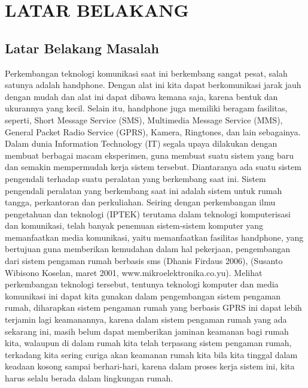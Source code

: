 \documentclass{jtetiproposalskripsi}
\begin{document}
\tableofcontents
{}
\clearpage{}\setcounter{page}{1}

\chapter{LATAR BELAKANG}

\section{Latar Belakang Masalah}
Perkembangan teknologi komunikasi saat ini berkembang sangat pesat, salah satunya adalah handphone. Dengan alat ini kita dapat berkomunikasi jarak jauh dengan mudah dan alat ini dapat dibawa kemana saja, karena bentuk dan ukurannya yang kecil. Selain itu, handphone juga memiliki beragam fasilitas, seperti, Short Message Service (SMS), Multimedia Message Service (MMS), General Packet Radio Service (GPRS), Kamera, Ringtones,  dan lain sebagainya.
Dalam dunia Information Technology (IT) segala upaya dilakukan dengan membuat berbagai macam eksperimen, guna membuat suatu sistem yang baru dan semakin mempermudah kerja sistem tersebut. Diantaranya ada suatu sistem pengendali terhadap suatu peralatan yang berkembang saat ini. Sistem pengendali peralatan yang berkembang saat ini  adalah sistem untuk rumah tangga, perkantoran dan perkuliahan.
Seiring dengan perkembangan ilmu pengetahuan dan teknologi (IPTEK) terutama dalam teknologi komputerisasi dan komunikasi, telah banyak penemuan sistem-sistem komputer yang memanfaatkan media komunikasi, yaitu memanfaatkan fasilitas handphone, yang bertujuan guna memberikan kemudahan dalam hal pekerjaan, pengembangan dari sistem pengaman rumah berbasis sms (Dhanis Firdaus 2006), (Susanto Wibisono Koselan, maret 2001, www.mikroelektronika.co.yu).
Melihat perkembangan teknologi tersebut, tentunya teknologi komputer dan media komunikasi ini dapat kita gunakan dalam pengembangan sistem pengaman rumah, diharapkan sistem pengaman rumah yang berbasis GPRS ini dapat lebih terjamin lagi keamanannya, karena dalam sistem pengaman rumah yang ada sekarang ini, masih belum dapat memberikan jaminan keamanan bagi rumah kita, walaupun di dalam rumah kita telah terpasang sistem pengaman rumah, terkadang kita sering curiga akan keamanan rumah kita bila kita tinggal dalam keadaan kosong sampai berhari-hari, karena dalam proses kerja sistem ini, kita harus selalu berada dalam lingkungan rumah. 
\end{document}
